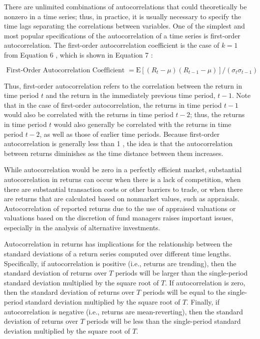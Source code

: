 \documentclass[11pt]{article}
\begin{document}
There are unlimited combinations of autocorrelations that could theoretically be nonzero in a time series; thus, in practice, it is usually necessary to specify the time lags separating the correlations between variables. One of the simplest and most popular specifications of the autocorrelation of a time series is first-order autocorrelation. The first-order autocorrelation coefficient is the case of $k=1$ from Equation 6 , which is shown in Equation 7 :


\begin{equation*}
\text { First-Order Autocorrelation Coefficient }=\mathrm{E}\left[\left(R_{t}-\mu\right)\left(R_{t-1}-\mu\right)\right] /\left(\sigma_{t} \sigma_{t-1}\right) \tag{7}
\end{equation*}


Thus, first-order autocorrelation refers to the correlation between the return in time period $t$ and the return in the immediately previous time period, $t-1$. Note that in the case of first-order autocorrelation, the returns in time period $t-1$ would also be correlated with the returns in time period $t-2$; thus, the returns in time period $t$ would also generally be correlated with the returns in time period $t-2$, as well as those of earlier time periods. Because first-order autocorrelation is generally less than 1 , the idea is that the autocorrelation between returns diminishes as the time distance between them increases.

While autocorrelation would be zero in a perfectly efficient market, substantial autocorrelation in returns can occur when there is a lack of competition, when there are substantial transaction costs or other barriers to trade, or when there are returns that are calculated based on nonmarket values, such as appraisals. Autocorrelation of reported returns due to the use of appraised valuations or valuations based on the discretion of fund managers raises important issues, especially in the analysis of alternative investments.

Autocorrelation in returns has implications for the relationship between the standard deviations of a return series computed over different time lengths. Specifically, if autocorrelation is positive (i.e., returns are trending), then the standard deviation of returns over $T$ periods will be larger than the single-period standard deviation multiplied by the square root of $T$. If autocorrelation is zero, then the standard deviation of returns over $T$ periods will be equal to the single-period standard deviation multiplied by the square root of $T$. Finally, if autocorrelation is negative (i.e., returns are mean-reverting), then the standard deviation of returns over $T$ periods will be less than the single-period standard deviation multiplied by the square root of $T$.
\end{document}
